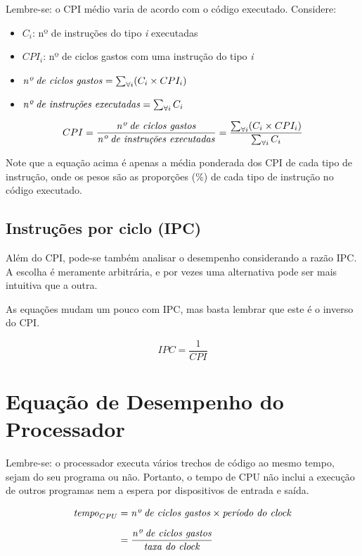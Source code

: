 \documentclass[12pt]{article}
\newcommand{\Text}[1]{\textrm{\textit{#1}}}
\begin{document}
Lembre-se: o CPI médio varia de acordo com o código executado. Considere:
\begin{itemize}
  \item \( C_i \): nº de instruções do tipo \emph{i} executadas
  \item \( CPI_i \): nº de ciclos gastos com uma instrução do tipo \emph{i}
  \item \( \Text{nº de ciclos gastos} = \sum_{\forall i} (C_i \times CPI_i) \)
  \item \( \Text{nº de instruções executadas} = \sum_{\forall i} C_i \)
\end{itemize}

\[
  CPI = \frac{\Text{nº de ciclos gastos}}{\Text{nº de instruções executadas}}
  = \frac{\sum_{\forall i} (C_i \times CPI_i)}{\sum_{\forall i} C_i}
\]

Note que a equação acima é apenas a média ponderada dos CPI de cada tipo de instrução, onde os pesos são as proporções (\%) de cada tipo de instrução no código executado.


\subsection{Instruções por ciclo (IPC)}

Além do CPI, pode-se também analisar o desempenho considerando a razão IPC. A escolha é meramente arbitrária, e por vezes uma alternativa pode ser mais intuitiva que a outra.

As equações mudam um pouco com IPC, mas basta lembrar que este é o inverso do CPI.

\[ IPC = \frac{1}{CPI} \]


\section{Equação de Desempenho do Processador}


Lembre-se: o processador executa vários trechos de código ao mesmo tempo, sejam do seu programa ou não. Portanto, o tempo de CPU não inclui a execução de outros programas nem a espera por dispositivos de entrada e saída.

\begin{align} \label{eq:tempocpu}
  \Text{tempo}_{CPU} &= \Text{nº de ciclos gastos} \times \Text{período do clock} \\[\medskipamount]
  &= \frac{\Text{nº de ciclos gastos}}{\Text{taxa do clock}} \nonumber
\end{align}
\end{document}
